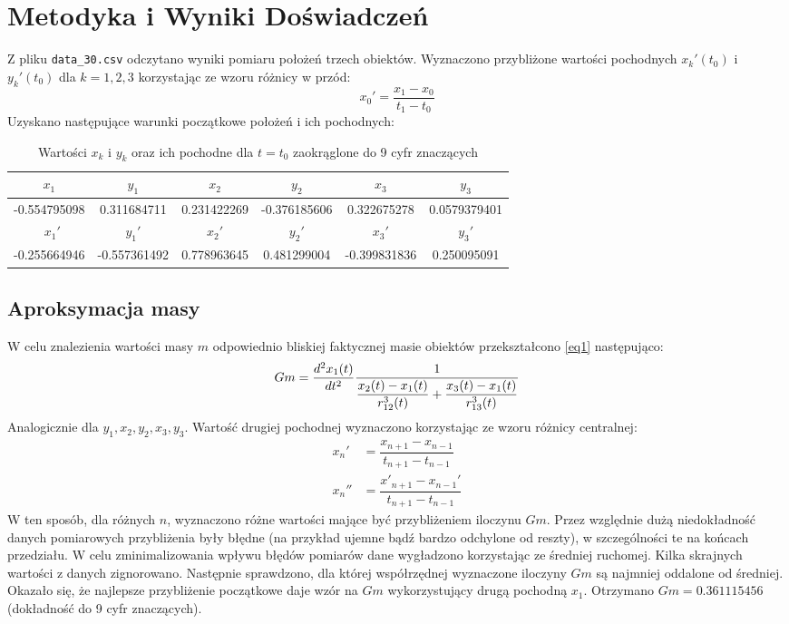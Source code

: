 \documentclass[a4paper, 12pt, twoside, openany]{article}
\begin{document}
	
	\section{Metodyka i Wyniki Doświadczeń}
	
	Z pliku \texttt{data\_30.csv} odczytano wyniki pomiaru położeń trzech obiektów. Wyznaczono przybliżone wartości pochodnych $x_k'(t_0)$ i $y_k'(t_0)$ dla $k = 1,2,3$ korzystając ze wzoru różnicy w przód:
	$$ x_0' = \dfrac{x_1 - x_0}{t_1 - t_0} $$
	Uzyskano następujące warunki początkowe położeń i ich pochodnych: 
	\begin{table}[H]
		\centering
		\begin{tabular}{|c|c|c|c|c|c|}
			\hline
			$x_1$ & $y_1$ & $x_2$ & $y_2$ & $x_3$ & $y_3$ \\
			\hline
			-0.554795098 & 0.311684711 & 0.231422269 & -0.376185606 & 0.322675278 & 0.0579379401 \\
			\hline\
			$x_1'$ & $y_1'$ & $x_2'$ & $y_2'$ & $x_3'$ & $y_3'$ \\
			\hline
			-0.255664946 & -0.557361492 & 0.778963645 & 0.481299004 & -0.399831836 & 0.250095091 \\
			\hline
		\end{tabular}
		\caption{Wartości $x_k$ i $y_k$ oraz ich pochodne dla $t = t_0$ zaokrąglone do 9 cyfr znaczących}
	\end{table}
	
	\subsection{Aproksymacja masy}  
	W celu znalezienia wartości masy $m$ odpowiednio bliskiej faktycznej masie obiektów przekształcono \eqref{eq1} następująco:
	$$			
	Gm = \dfrac{d^2x_1(t)}{dt^2} \dfrac{1}{ \dfrac{x_2(t) - x_1(t)}{r^3_{12}(t)} + \dfrac{x_3(t) - x_1(t)}{r^3_{13}(t)}} \\
	$$
	Analogicznie dla $y_1,x_2,y_2,x_3,y_3$. Wartość drugiej pochodnej wyznaczono korzystając ze wzoru różnicy centralnej:
	$$
	\begin{aligned}
		x_n'  &= \dfrac{x_{n+1} - x_{n-1}}{t_{n+1} - t_{n-1}} \\
		x_n'' &= \dfrac{x'_{n+1} - x_{n-1}'}{t_{n+1} - t_{n-1}} 
	\end{aligned}
	$$
	W ten sposób, dla różnych $n$, wyznaczono różne wartości mające być przybliżeniem iloczynu $Gm$.
	Przez względnie dużą niedokładność danych pomiarowych przybliżenia były błędne (na przykład ujemne bądź bardzo odchylone od reszty), w szczególności te na końcach przedziału. W celu zminimalizowania wpływu błędów pomiarów dane wygładzono korzystając ze średniej ruchomej. Kilka skrajnych wartości z danych zignorowano. Następnie sprawdzono, dla której współrzędnej wyznaczone iloczyny $Gm$ są najmniej oddalone od średniej.\\
	Okazało się, że najlepsze przybliżenie początkowe daje wzór na $Gm$ wykorzystujący drugą pochodną $x_1$. Otrzymano $Gm = 0.361115456$ (dokładność do 9 cyfr znaczących).
	
\end{document}

